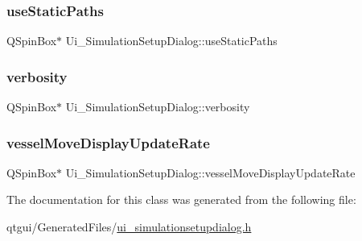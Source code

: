 \subsubsection{\texorpdfstring{useStaticPaths}{useStaticPaths}}
{\footnotesize\ttfamily Q\+Spin\+Box$\ast$ Ui\+\_\+\+Simulation\+Setup\+Dialog\+::use\+Static\+Paths}

\mbox{\label{class_ui___simulation_setup_dialog_af33db8f3322bda9f9d25dc36c75afdf9}} 
\subsubsection{\texorpdfstring{verbosity}{verbosity}}
{\footnotesize\ttfamily Q\+Spin\+Box$\ast$ Ui\+\_\+\+Simulation\+Setup\+Dialog\+::verbosity}

\mbox{\label{class_ui___simulation_setup_dialog_ab3d4ef9a3d89c14f0cda2711e3567e86}} 
\subsubsection{\texorpdfstring{vesselMoveDisplayUpdateRate}{vesselMoveDisplayUpdateRate}}
{\footnotesize\ttfamily Q\+Spin\+Box$\ast$ Ui\+\_\+\+Simulation\+Setup\+Dialog\+::vessel\+Move\+Display\+Update\+Rate}



The documentation for this class was generated from the following file\+:\begin{DoxyCompactItemize}
\item 
qtgui/\+Generated\+Files/\mbox{\hyperlink{ui__simulationsetupdialog_8h}{ui\+\_\+simulationsetupdialog.\+h}}\end{DoxyCompactItemize}
